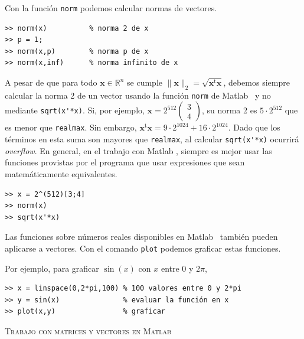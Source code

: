 \documentclass[letter,11pt]{article}
\newcommand\R{\mathbb{R}}
\newcommand\0{\mathbf{0}}
\newcommand{\matlab}{{\sc Matlab }}
\begin{document}
\medskip
				
	Con la funci\'on \Verb+norm+ podemos calcular normas de vectores.

	\medskip

\begin{lstlisting}
>> norm(x)          % norma 2 de x
>> p = 1;
>> norm(x,p)        % norma p de x
>> norm(x,inf)      % norma infinito de x
\end{lstlisting}

\medskip	

	A pesar de que para todo $\boldsymbol{x} \in \R^n$ se cumple
	$\|\boldsymbol{x}\|_2 = \sqrt{\boldsymbol{x}^{\text{t}}\boldsymbol{x}}$, debemos siempre calcular la norma 2 de
	un vector usando la funci\'on \Verb+norm+ de \matlab\, y no mediante
	\Verb+sqrt(x'*x)+. Si, por ejemplo,
	$\boldsymbol{x} = 2^{512}\begin{pmatrix}3\\4\end{pmatrix}$, su norma 2
	es $5\cdot 2^{512}$ que es menor que \Verb+realmax+.
	Sin embargo,
	$\boldsymbol{x}^{\text{t}}\boldsymbol{x} = 9\cdot 2^{1024} + 16\cdot 2^{1024}$.
	Dado que los t\'erminos en esta suma son mayores que \Verb+realmax+,
	al calcular \Verb+sqrt(x'*x)+ ocurrir\'a {\em overflow}.
	En general, en el trabajo con \matlab, siempre es mejor usar las funciones
	provistas por el programa que usar expresiones que sean matem\'aticamente
	equivalentes.
	
	\medskip

\begin{lstlisting}
>> x = 2^(512)[3;4]
>> norm(x)
>> sqrt(x'*x)
\end{lstlisting}

\medskip				
				
	Las funciones sobre n\'umeros reales disponibles en \matlab\, tambi\'en pueden
	aplicarse a vectores. Con el comando \Verb+plot+ podemos graficar estas funciones.
	
	Por ejemplo, para graficar $\sin(x)$ con $x$ entre 0 y $2\pi$,
	
	\medskip

\begin{lstlisting}
>> x = linspace(0,2*pi,100) % 100 valores entre 0 y 2*pi
>> y = sin(x)               % evaluar la función en x
>> plot(x,y)                % graficar
\end{lstlisting}

\bigskip
\centerline{\textsc{Trabajo con matrices y vectores en \matlab}}
\medskip
\end{document}
